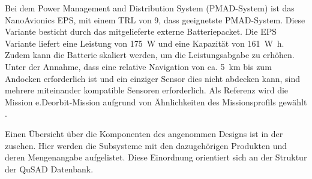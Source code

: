 				Bei dem Power Management and Distribution System (PMAD-System) ist das NanoAvionics EPS, mit einem TRL von \num{9}, dass geeignetste PMAD-System. Diese Variante besticht durch das mitgelieferte externe Batteriepacket. Die EPS Variante liefert eine Leistung von \SI{175}{\watt} und eine Kapazität von \SI{161}{\watt\hour}. Zudem kann die Batterie skaliert werden, um die Leistungsabgabe zu erhöhen. Unter der Annahme, dass eine relative Navigation von ca. \SI{5}{\kilo\metre} bis zum Andocken erforderlich ist und ein einziger Sensor dies nicht abdecken kann, sind mehrere miteinander kompatible Sensoren erforderlich. Als Referenz wird die Mission e.Deorbit-Mission aufgrund von Ähnlichkeiten des Missionsprofils gewählt \cite{Lettau.}.  

				Einen Übersicht über die Komponenten des angenommen Designs ist in der  zusehen. Hier werden die Subsysteme mit den dazugehörigen Produkten und deren Mengenangabe aufgelistet. Diese Einordnung orientiert sich an der Struktur der QuSAD Datenbank.
